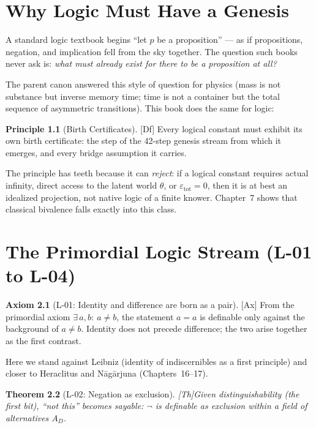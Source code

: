 \documentclass[11pt,a4paper,twoside]{book}
\newcommand{\tier}[1]{\textnormal{\small\textsf{[#1]}}}
\newcommand{\Ax}{\tier{Ax}}\newcommand{\Th}{\tier{Th}}\newcommand{\Thstar}{\tier{Th$^{*}$}}
\newcommand{\Df}{\tier{Df}}\newcommand{\OpenT}{\tier{Open}}
\theoremstyle{plain}
\newtheorem{theorem}{Theorem}[chapter]
\theoremstyle{definition}
\newtheorem{axiom}[theorem]{Axiom}
\newtheorem{principle}[theorem]{Principle}
\theoremstyle{remark}
\begin{document}
\chapter{Why Logic Must Have a Genesis}

A standard logic textbook begins ``let $p$ be a proposition'' --- as if
propositions, negation, and implication fell from the sky together. The
question such books never ask is: \emph{what must already exist for there to
be a proposition at all?}

The parent canon answered this style of question for physics (mass is not
substance but inverse memory time; time is not a container but the total
sequence of asymmetric transitions). This book does the same for logic:

\begin{principle}[Birth Certificates]\Df
Every logical constant must exhibit its own birth certificate: the step of the
42-step genesis stream from which it emerges, and every bridge assumption it
carries.
\end{principle}

The principle has teeth because it can \emph{reject}: if a logical constant
requires actual infinity, direct access to the latent world $\theta$, or
$\varepsilon_{\mathrm{tot}}=0$, then it is at best an idealized projection,
not native logic of a finite knower. Chapter~7 shows that classical bivalence
falls exactly into this class.

\chapter{The Primordial Logic Stream (L-01 to L-04)}

\begin{axiom}[L-01: Identity and difference are born as a pair]\Ax
From the primordial axiom $\exists\,a,b:\ a\neq b$, the statement $a=a$ is
definable only against the background of $a\neq b$. Identity does not precede
difference; the two arise together as the first contrast.
\end{axiom}

Here we stand against Leibniz (identity of indiscernibles as a first
principle) and closer to Heraclitus and N\=ag\=arjuna (Chapters~16--17).

\begin{theorem}[L-02: Negation as exclusion]\Th\label{th:negation}
Given distinguishability (the first bit), ``not this'' becomes sayable:
$\neg$ is definable as \emph{exclusion within a field of alternatives}
$A_D$.
\end{theorem}
\end{document}
